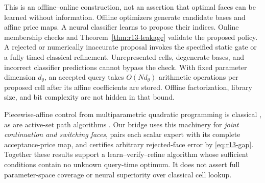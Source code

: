 \documentclass[11pt,letterpaper]{article}
\theoremstyle{definition}
\newcommand{\1}{\mathbf 1}
\begin{document}
This is an offline--online construction, not an assertion that optimal faces can be learned without information. Offline optimizers generate candidate bases and affine price maps. A neural classifier learns to propose their indices. Online membership checks and Theorem~\ref{thm:r13-leakage} validate the proposed policy. A rejected or numerically inaccurate proposal invokes the specified static gate or a fully timed classical refinement. Unrepresented cells, degenerate bases, and incorrect classifier predictions cannot bypass the check. With fixed parameter dimension $d_\theta$, an accepted query takes $O(Nd_\theta)$ arithmetic operations per proposed cell after its affine coefficients are stored. Offline factorization, library size, and bit complexity are not hidden in that bound.

Piecewise-affine control from multiparametric quadratic programming is classical \citep{Bemporad2002}, as are active-set path algorithms \citep{ArnoldTibshirani2016}. Our bridge uses this machinery for \emph{joint continuation and switching faces}, pairs each scalar expert with its complete acceptance-price map, and certifies arbitrary rejected-face error by \eqref{eq:r13-gap}. Together these results support a learn--verify--refine algorithm whose sufficient conditions contain no unknown query-time optimum. It does not assert full parameter-space coverage or neural superiority over classical cell lookup.
\end{document}
